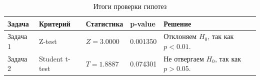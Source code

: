 \begin{table}[H]
\centering
\caption{Итоги проверки гипотез}
\begin{tabular}{|p{3.0cm}|p{1.8cm}|p{2.2cm}|p{2.2cm}|p{5.2cm}|}
\hline
Задача & Критерий & Статистика & p-value & Решение \\
\hline
Задача 1 & Z-test & $Z=3.0000$ & 0.001350 & Отклоняем $H_0$, так как $p < 0.01$. \\
\hline
Задача 2 & Student t-test & $T=1.8887$ & 0.074301 & Не отвергаем $H_0$, так как $p > 0.05$. \\
\hline
\end{tabular}
\end{table}